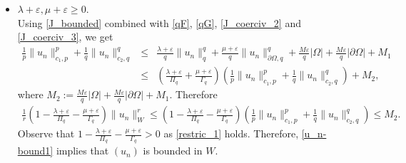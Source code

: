 \documentclass[pdflatex,sn-mathphys-num]{sn-jnl}
\theoremstyle{thmstyleone}%
\theoremstyle{thmstyletwo}%
\theoremstyle{thmstylethree}%
\theoremstyle{thmstylethree}%
\begin{document}
\begin{itemize}
    \item[Case 1:] 
$\lambda+\varepsilon,\mu+\varepsilon\geqslant 0$.\\
Using \eqref{J_bounded} combined with \eqref{qF}, \eqref{qG},  \eqref{J_coerciv_2} and \eqref{J_coerciv_3}, we get
 \begin{eqnarray*}
     \frac{1}{p}\|u_n\|_{c_1, p}^p+\frac{1}{q}\|u_n\|_{c_2, q}^q 
     &\leqslant & \frac{\lambda+\varepsilon}{q} \|u_n\|_q^q+\frac{\mu+\varepsilon}{q} \|u_n\|_{\partial \Omega,q}^q+\frac{M\varepsilon}{q}|\Omega|+\frac{M\varepsilon}{q}|\partial\Omega|+M_1\\
     &\leqslant & \left( \frac{\lambda+\varepsilon}{ {\Pi}_q}+\frac{\mu+\varepsilon}{ {\Gamma}_q} \right)\left( \frac{1}{p} \|u_n\|_{c_1, p}^p+\frac{1}{q} \|u_n\|_{c_2, q}^q\right)+M_2 ,
 \end{eqnarray*}
 where $M_2:=\frac{M\varepsilon}{q}|\Omega|+\frac{M\varepsilon}{q}|\partial\Omega|+M_1$.
 Therefore
 \begin{align}\label{u_n-bound1}
 \frac{1}r \left(1-\frac{\lambda+\varepsilon}{ {\Pi}_q}-\frac{\mu+\varepsilon}{ {\Gamma}_q}\right) \|u_n\|_{W}^r  \leqslant  \left( 1-\frac{\lambda+\varepsilon}{ {\Pi}_q}-\frac{\mu+\varepsilon}{ {\Gamma}_q} \right) \left( \frac{1}{p} \|u_n\|_{c_1, p}^p +  \frac{1}{q} \|u_n\|_{c_2, q}^q \right) \leqslant  M_2.
 \end{align}
Observe that $1-\frac{\lambda+\varepsilon}{ {\Pi}_q}-\frac{\mu+\varepsilon}{ {\Gamma}_q}>0$ as \eqref{restric_1} holds. Therefore, 
\eqref{u_n-bound1} implies that $(u_n)$ is bounded in $W$. \\



\end{itemize}
\end{document}
